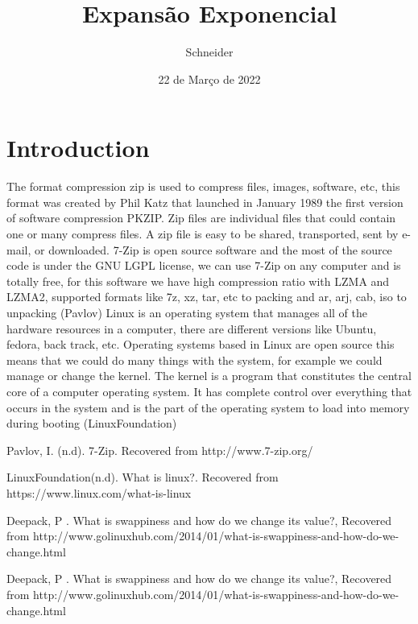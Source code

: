 \documentclass[a4paper]{article}
\title{ Expansão Exponencial }
\author{\normalsize Schneider\\\normalsize}
\date{\color{black}22 de Março de 2022}
\begin{document}
 \maketitle

\section{Introduction}
 The format compression zip is used to compress files, images, software, etc, this format was created by Phil Katz that launched in January 1989 the first version of software compression PKZIP.  Zip files are individual files that could contain one or many compress files. A zip file is easy to be shared, transported, sent by e-mail, or downloaded.  7-Zip is open source software and the most of the source code is under the GNU LGPL license, we can use 7-Zip on any computer and is totally free, for this software we have high compression ratio with LZMA and LZMA2, supported formats like 7z, xz, tar, etc to packing and ar, arj, cab, iso to unpacking (Pavlov)
Linux is an operating system that manages all of the hardware resources in a computer, there are different versions like Ubuntu, fedora, back track, etc. Operating systems based in Linux are open source this means that we could do many things with the system, for example we could manage or change the kernel.
The kernel is a program that constitutes the central core of a computer operating system. It has complete control over everything that occurs in the system and is the part of the operating system to load into memory during booting (LinuxFoundation)


\begin{thebibliography}{} 
    
     Pavlov, I.
    (n.d). 7-Zip. Recovered from http://www.7-zip.org/
        
     LinuxFoundation(n.d). What is linux?. Recovered from https://www.linux.com/what-is-linux
        
     Deepack, P . What is swappiness and how do we change its value?, Recovered from http://www.golinuxhub.com/2014/01/what-is-swappiness-and-how-do-we-change.html  

     Deepack, P . What is swappiness and how do we change its value?, Recovered from http://www.golinuxhub.com/2014/01/what-is-swappiness-and-how-do-we-change.html  


   
\end{thebibliography}
\end{document}
